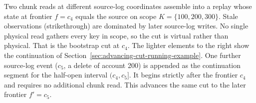 
\caption{Two chunk reads at different source-log coordinates assemble
into a replay whose state at frontier $f = c_4$ equals the source on
scope $K = \{100, 200, 300\}$. Stale observations (strikethrough) are
dominated by later source-log writes. No single physical read gathers
every key in scope, so the cut is virtual rather than physical.
That is the bootstrap cut at $c_4$. The lighter elements to the right
show the continuation of
Section~\ref{sec:advancing-cut-running-example}. One further
source-log event ($c_5$, a delete of account 200) is appended as the
continuation segment for the half-open interval $(c_4, c_5]$. It begins
strictly after the frontier $c_4$ and requires no additional chunk read. This advances
the same cut to the later frontier $f' = c_5$.}
\label{fig:running-example-timeline}
